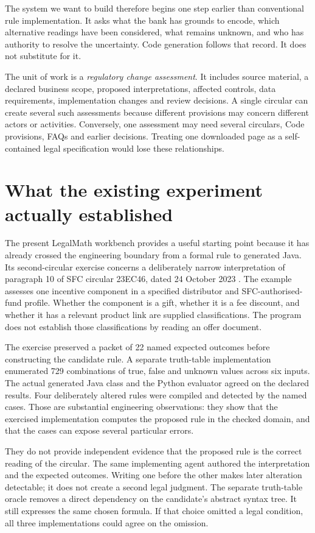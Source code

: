 \documentclass[12pt,a4paper,oneside,openany]{book}
\begin{document}
The system we want to build therefore begins one step earlier than conventional
rule implementation. It asks what the bank has grounds to encode, which
alternative readings have been considered, what remains unknown, and who has
authority to resolve the uncertainty. Code generation follows that record. It
does not substitute for it.

The unit of work is a \emph{regulatory change assessment}. It includes source
material, a declared business scope, proposed interpretations, affected controls,
data requirements, implementation changes and review decisions. A single
circular can create several such assessments because different provisions may
concern different actors or activities. Conversely, one assessment may need
several circulars, Code provisions, FAQs and earlier decisions. Treating one
downloaded page as a self-contained legal specification would lose these
relationships.

\section{What the existing experiment actually established}
\label{sec:problem-evidence}
The present LegalMath workbench provides a useful starting point because it has
already crossed the engineering boundary from a formal rule to generated Java.
Its second-circular exercise concerns a deliberately narrow interpretation of
paragraph 10 of SFC circular 23EC46, dated 24 October 2023
\citep{sfcmarketing}. The example assesses one incentive component in a specified
distributor and SFC-authorised-fund profile. Whether the component is a gift,
whether it is a fee discount, and whether it has a relevant product link are
supplied classifications. The program does not establish those classifications
by reading an offer document.

The exercise preserved a packet of 22 named expected outcomes before constructing
the candidate rule. A separate truth-table implementation enumerated 729
combinations of true, false and unknown values across six inputs. The actual
generated Java class and the Python evaluator agreed on the declared results.
Four deliberately altered rules were compiled and detected by the named cases.
Those are substantial engineering observations: they show that the exercised
implementation computes the proposed rule in the checked domain, and that the
cases can expose several particular errors.

They do not provide independent evidence that the proposed rule is the correct
reading of the circular. The same implementing agent authored the interpretation
and the expected outcomes. Writing one before the other makes later alteration
detectable; it does not create a second legal judgment. The separate truth-table
oracle removes a direct dependency on the candidate's abstract syntax tree. It
still expresses the same chosen formula. If that choice omitted a legal
condition, all three implementations could agree on the omission.
\end{document}
